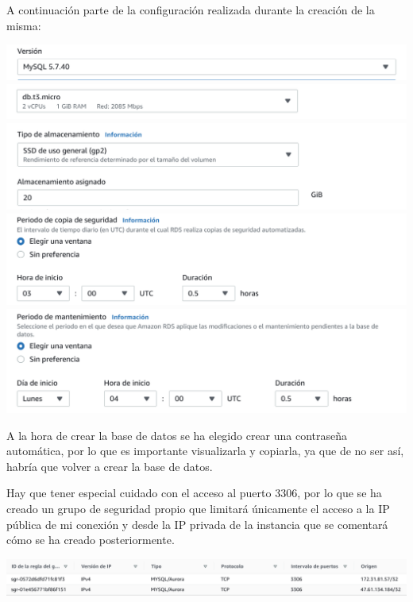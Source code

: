 \documentclass{\ClassPath/viu-tfm-template}
\begin{document}
A continuación parte de la configuración realizada durante la creación de la misma:

\begin{center}
    \includegraphics[frame,width=0.8\linewidth]{img/db1.png}
    \includegraphics[frame,width=0.8\linewidth]{img/db2.png}
    \includegraphics[frame,width=0.8\linewidth]{img/db3.png}
    \includegraphics[frame,width=0.8\linewidth]{img/db4.png}
    \includegraphics[frame,width=0.8\linewidth]{img/db5.png}
\end{center}


A la hora de crear la base de datos se ha elegido crear una contraseña automática, por lo que es importante visualizarla y copiarla, ya que de no ser así, habría que volver a crear la base de datos.


Hay que tener especial cuidado con el acceso al puerto 3306, por lo que se ha creado un grupo de seguridad propio que limitará únicamente el acceso a la IP pública de mi conexión y desde la IP privada de la instancia que se comentará cómo se ha creado posteriormente.

\begin{center}
    \includegraphics[frame,width=\linewidth]{img/db-reglas.png}
\end{center}
\end{document}

